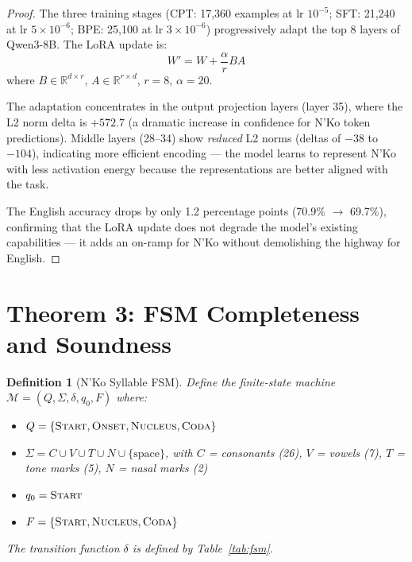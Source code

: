 \documentclass[11pt]{article}
\newtheorem{definition}[theorem]{Definition}
\theoremstyle{remark}
\begin{document}
\begin{proof}
The three training stages (CPT: 17,360 examples at lr $10^{-5}$; SFT: 21,240 at lr $5 \times 10^{-6}$; BPE: 25,100 at lr $3 \times 10^{-6}$) progressively adapt the top 8 layers of Qwen3-8B. The LoRA update is:
\begin{equation}
W' = W + \frac{\alpha}{r} BA
\end{equation}
where $B \in \mathbb{R}^{d \times r}$, $A \in \mathbb{R}^{r \times d}$, $r = 8$, $\alpha = 20$.

The adaptation concentrates in the output projection layers (layer 35), where the L2 norm delta is $+572.7$ (a dramatic increase in confidence for N'Ko token predictions). Middle layers (28--34) show \emph{reduced} L2 norms (deltas of $-38$ to $-104$), indicating more efficient encoding --- the model learns to represent N'Ko with less activation energy because the representations are better aligned with the task.

The English accuracy drops by only 1.2 percentage points (70.9\% $\to$ 69.7\%), confirming that the LoRA update does not degrade the model's existing capabilities --- it adds an on-ramp for N'Ko without demolishing the highway for English.
\end{proof}

\section{Theorem 3: FSM Completeness and Soundness}

\begin{definition}[N'Ko Syllable FSM]
Define the finite-state machine $\mathcal{M} = (Q, \Sigma, \delta, q_0, F)$ where:
\begin{itemize}
\item $Q = \{\textsc{Start}, \textsc{Onset}, \textsc{Nucleus}, \textsc{Coda}\}$
\item $\Sigma = C \cup V \cup T \cup N \cup \{\text{space}\}$, with $C$ = consonants (26), $V$ = vowels (7), $T$ = tone marks (5), $N$ = nasal marks (2)
\item $q_0 = \textsc{Start}$
\item $F = \{\textsc{Start}, \textsc{Nucleus}, \textsc{Coda}\}$
\end{itemize}
The transition function $\delta$ is defined by Table~\ref{tab:fsm}.
\end{definition}
\end{document}
